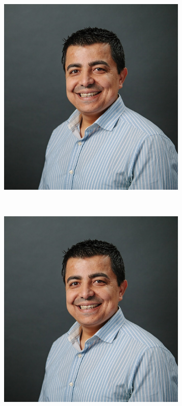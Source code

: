 \begin{figure}[h]
\begin{center}
\begin{subfigure}{0.3\textwidth}
  \includegraphics[width=0.99\textwidth]{figures/cover/ali.jpg}
  \caption{}
 \end{subfigure}
 \\
 \begin{subfigure}{0.3\textwidth}
  \includegraphics[width=0.99\textwidth]{figures/cover/ali.jpg}

\end{subfigure}
\end{center}
\end{figure}
